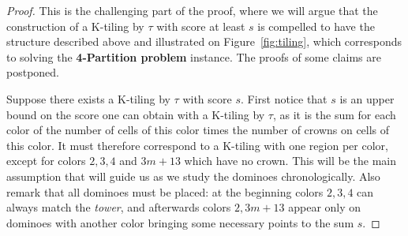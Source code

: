 \documentclass[11pt,a4paper]{article}
\newcommand{\1}{\mathbb{1}}
\newcommand{\0}{\mathbb{0}}
\begin{document}
\begin{proof}
  \medskip
  \fbox{$\Leftarrow$} This is the challenging part of the proof, where we will
  argue that the construction of a K-tiling by $\tau$ with score at least $s$
  is compelled to have the structure described above and illustrated on
  Figure~\ref{fig:tiling}, which corresponds to solving the {\bf 4-Partition
  problem} instance. The proofs of some claims are postponed.
  
  Suppose there exists a K-tiling by $\tau$ with score $s$. First notice that
  $s$ is an upper bound on the score one can obtain with a K-tiling by $\tau$,
  as it is the sum for each color of the number of cells of this color times
  the number of crowns on cells of this color. It must therefore correspond to
  a K-tiling with one region per color, except for colors $2,3,4$ and $3m+13$
  which have no crown. This will be the main assumption that will guide us as
  we study the dominoes chronologically. Also remark that all dominoes must be
  placed: at the beginning colors $2,3,4$ can always match the {\em tower}, and
  afterwards colors $2,3m+13$ appear only on dominoes with another color
  bringing some necessary points to the sum $s$.


\end{proof}
\end{document}

